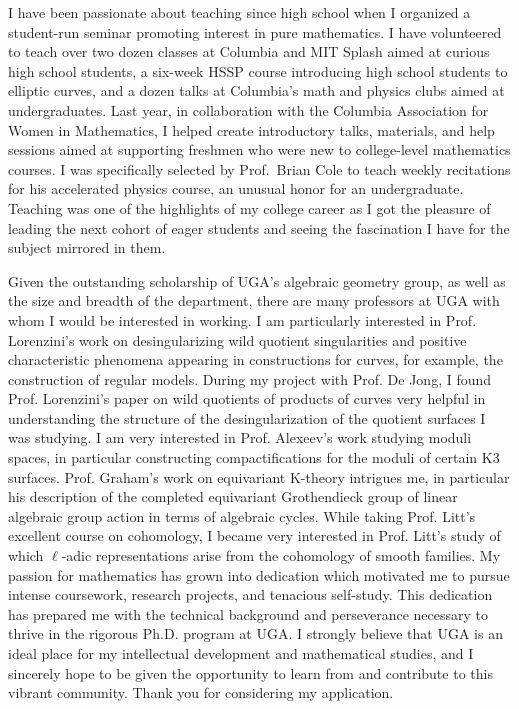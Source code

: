 \documentclass[11pt]{article}
\begin{document}
I have been passionate about teaching since high school when I organized a student-run seminar promoting interest in pure mathematics. I have volunteered to teach over two dozen classes at Columbia and MIT Splash aimed at curious high school students, a six-week HSSP course introducing high school students to elliptic curves, and a dozen talks at Columbia's math and physics clubs aimed at undergraduates. Last year, in collaboration with the Columbia Association for Women in Mathematics, I helped create introductory talks, materials, and help sessions aimed at supporting freshmen who were new to college-level mathematics courses. I was specifically selected by Prof.\ Brian Cole to teach weekly recitations for his accelerated physics course, an unusual honor for an undergraduate. Teaching was one of the highlights of my college career as I got the pleasure of leading the next cohort of eager students and seeing the fascination I have for the subject mirrored in them.
\par
Given the outstanding scholarship of UGA’s algebraic geometry group, as well as the size and breadth of the department, there are many professors at UGA with whom I would be interested in working. I am particularly interested in Prof. Lorenzini’s work on desingularizing wild quotient singularities and positive characteristic phenomena appearing in constructions for curves, for example, the construction of regular models. During my project with Prof. De Jong, I found Prof. Lorenzini’s paper on wild quotients of products of curves very helpful in understanding the structure of the desingularization of the quotient surfaces I was studying. I am very interested in Prof. Alexeev’s work studying moduli spaces, in particular constructing compactifications for the moduli of certain K3 surfaces. Prof. Graham’s work on equivariant K-theory intrigues me, in particular his description of the completed equivariant Grothendieck group of linear algebraic group action in terms of algebraic cycles. While taking Prof. Litt’s excellent course on \etale cohomology, I became very interested in Prof. Litt’s study of which $\ell$-adic representations arise from the cohomology of smooth families. My passion for mathematics has grown into dedication which motivated me to pursue intense coursework, research projects, and tenacious self-study. This dedication has prepared me with the technical background and perseverance necessary to thrive in the rigorous Ph.D. program at UGA. I strongly believe that UGA is an ideal place for my intellectual development and mathematical studies, and I sincerely hope to be given the opportunity to learn from and contribute to this vibrant community. Thank you for considering my application.
\end{document}
